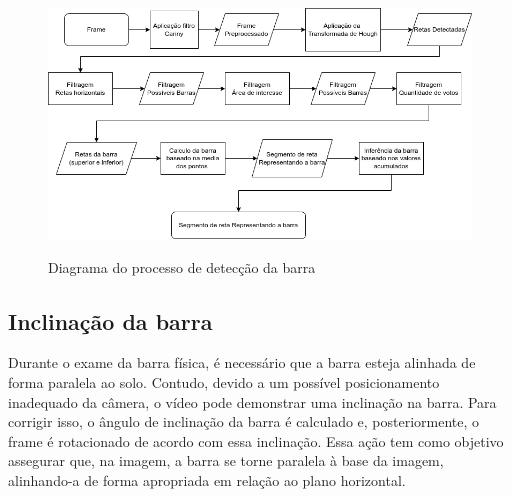 \begin{figure}[H]
	\centering
    \caption{Diagrama do processo de detecção da barra}
	\includegraphics[scale=0.6]{figuras/diagrama/detectar barra.png}
	\label{diagrama:Detectar barra}
\end{figure}


\subsection[Inclinação da barra]{Inclinação da barra}\label{sec:Inclinacao da barra}

Durante o exame da barra física, é necessário que a barra esteja alinhada de forma paralela ao solo. Contudo, devido a um possível posicionamento inadequado da câmera, o vídeo pode demonstrar uma inclinação na barra. Para corrigir isso, o ângulo de inclinação da barra é calculado e, posteriormente, o frame é rotacionado de acordo com essa inclinação. Essa ação tem como objetivo assegurar que, na imagem, a barra se torne paralela à base da imagem, alinhando-a de forma apropriada em relação ao plano horizontal.

